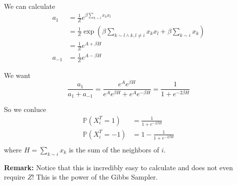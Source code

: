 \documentclass[12pt]{report}
\renewcommand{\P}{\mathbb{P}}
\newcommand*{\tbf}[1]{\ifmmode\mathbf{#1}\else\textbf{#1}\fi}
\begin{document}
We can calculate
\begin{align*}
	a_1    & = \frac{1}{Z} e^{\beta \sum_{k \sim l} x_k x_l}                                                            \\
	       & = \frac{1}{Z} \exp\left(\beta \sum_{k \sim l \land k, l \neq i} x_k x_l + \beta \sum_{k \sim i} x_k\right) \\
	       & = \frac{1}{Z} e^{A + \beta H}                                                                              \\
	a_{-1} & = \frac{1}{Z} e^{A - \beta H}
\end{align*}

We want
\[\frac{a_1}{a_1 + a_{-1}} = \frac{e^A e^{\beta H}}{e^A e^{\beta H} + e^A e^{-\beta H}} = \frac{1}{1 + e^{-2\beta H}}\]

So we conluce
\begin{align*}
	\P(X^T_i = 1)  & = \frac{1}{1 + e^{-2\beta H}}     \\
	\P(X^T_i = -1) & = 1 - \frac{1}{1 + e^{-2\beta H}} \\
\end{align*}
where $H = \sum_{k \sim i} x_k$ is the sum of the neighbors of $i$.

\tbf{Remark:} Notice that this is incredibly easy to calculate and does not even require $Z$! This is the power of the Gibbs Sampler.
\end{document}
